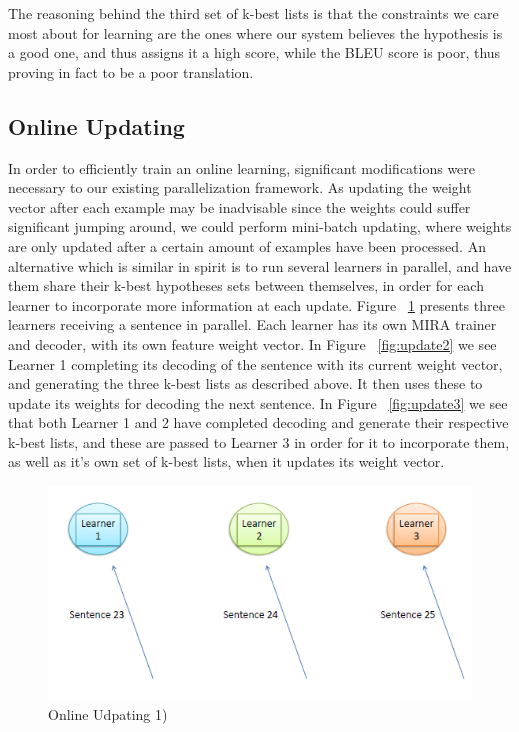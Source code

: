 The reasoning behind the third set of k-best lists is that the constraints we care most about for learning are the ones where our system believes the hypothesis is a good one, and thus assigns it a high score, while the BLEU score is poor, thus proving in fact to be a poor translation. 

\subsection{Online Updating}
In order to efficiently train an online learning, significant modifications were necessary to our existing parallelization framework. As updating the weight vector after each example may be inadvisable since the weights could suffer significant jumping around, we could perform mini-batch updating, where weights are only updated after a certain amount of examples have been processed. An alternative which is similar in spirit is to run several learners in parallel, and have them share their k-best hypotheses sets between themselves, in order for each learner to incorporate more information at each update. Figure ~\ref{fig:update1} presents three learners receiving a sentence in parallel. Each learner has its own MIRA trainer and decoder, with its own feature weight vector. In Figure ~\ref{fig:update2} we see Learner 1 completing its decoding of the sentence with its current weight vector, and generating the three k-best lists as described above. It then uses these to update its weights for decoding the next sentence. In Figure ~\ref{fig:update3} we see that both Learner 1 and 2 have completed decoding and generate their respective k-best lists, and these are passed to Learner 3 in order for it to incorporate them, as well as it's own set of k-best lists, when it updates its weight vector.

\begin{figure}[h]
	\centering
		\includegraphics[scale=0.5]{training_img_files/update1.PNG}
	\caption{Online Udpating 1)}
	\label{fig:update1}
\end{figure}


